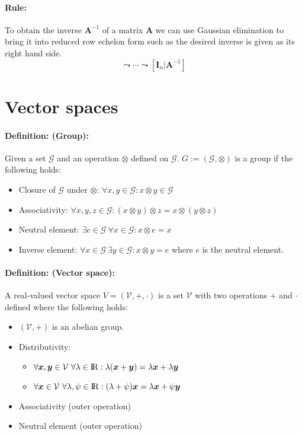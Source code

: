 \documentclass[12pt]{article}
\newcommand{\R}{{\rm I\!R}}
\newcommand{\A}{{\bm{A}}}
\newcommand{\xdefinition}[2]{\paragraph{\colorbox{#1!30}{\textbf{Definition:}} (#2):}}
\newcommand{\xrule}[1]{\paragraph{\colorbox{#1!30}{\textbf{Rule:}}}}
\newcommand{\mc}[1]{\mathcal{#1}}
\begin{document}
\xrule{red} To obtain the inverse $\A^{-1}$ of a matrix $\A$ we can use Gaussian elimination to bring it into reduced row echelon form such as the desired inverse is given as its right hand side.
%
\begin{equation}
	[\bm{A}|\bm{I}_n] \leadsto \cdots \leadsto [\bm{I}_n|\bm{A}^{-1}]
\end{equation}

\section{Vector spaces}

\xdefinition{green}{Group} Given a set $\mc{G}$ and an operation $\otimes$ defined on $\mc{G}$. $G := (\mc{G}, \otimes)$ is a group if the following holds:
%
\begin{itemize}
	\item Closure of $\mc{G}$ under $\otimes$: $\forall x, y \in \mc{G} : x \otimes y \in \mc{G}$
	\item Associativity: $\forall x, y, z \in \mc{G} : (x \otimes y) \otimes z = x \otimes (	y \otimes z)$
	\item Neutral element: $\exists e \in \mc{G} \ \forall x \in \mc{G} : x \otimes e = x$
	\item Inverse element: $\forall x \in \mc{G} \ \exists y \in \mc{G}: x \otimes y = e$ where $e$ is the neutral element.
\end{itemize}

\xdefinition{blue}{Vector space} A real-valued vector space $V = (\mc{V}, +, \cdot)$ is a set $\mc{V}$ with two operations $+$ and $\cdot$ defined where the following holds:
%
\begin{itemize}
	\item $(\mc{V}, +)$ is an abelian group.
	\item Distributivity:
	\begin{itemize}
	\item $\forall \bm{x}, \bm{y} \in \mc{V} \ \forall \lambda \in \R : \lambda(\bm{x} + \bm{y}) = \lambda \bm{x} + \lambda \bm{y}$
	\item $\forall \bm{x} \in \mc{V} \ \forall \lambda, \psi \in \R : (\lambda + \psi) \bm{x} = \lambda \bm{x} + \psi \bm{y}$
	\end{itemize}
	\item Associativity (outer operation)
	\item Neutral element (outer operation)
\end{itemize}
%
\end{document}
